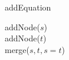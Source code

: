 \begin{algorithm}[h]
\caption[.]{addEquation}
	
	addNode($s$) \\
	addNode($t$) \\
	merge($s, t, s=t$)
  
  \label{algo:addEquation}
\end{algorithm}
